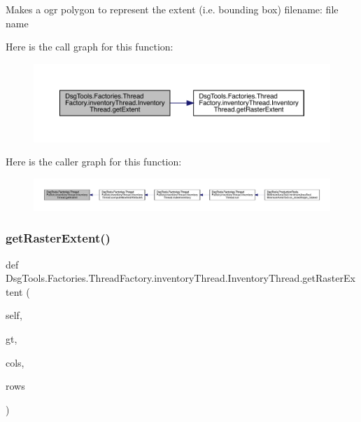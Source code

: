 \begin{DoxyVerb}Makes a ogr polygon to represent the extent (i.e. bounding box)
filename: file name
\end{DoxyVerb}
 Here is the call graph for this function\+:
\nopagebreak
\begin{figure}[H]
\begin{center}
\leavevmode
\includegraphics[width=350pt]{class_dsg_tools_1_1_factories_1_1_thread_factory_1_1inventory_thread_1_1_inventory_thread_a9b4252c1a4521ad460bd13842fe02483_cgraph}
\end{center}
\end{figure}
Here is the caller graph for this function\+:
\nopagebreak
\begin{figure}[H]
\begin{center}
\leavevmode
\includegraphics[width=350pt]{class_dsg_tools_1_1_factories_1_1_thread_factory_1_1inventory_thread_1_1_inventory_thread_a9b4252c1a4521ad460bd13842fe02483_icgraph}
\end{center}
\end{figure}
\mbox{\label{class_dsg_tools_1_1_factories_1_1_thread_factory_1_1inventory_thread_1_1_inventory_thread_a6fa65de4be1523486c67c51a95b0bd8c}} 
\subsubsection{\texorpdfstring{get\+Raster\+Extent()}{getRasterExtent()}}
{\footnotesize\ttfamily def Dsg\+Tools.\+Factories.\+Thread\+Factory.\+inventory\+Thread.\+Inventory\+Thread.\+get\+Raster\+Extent (\begin{DoxyParamCaption}\item[{}]{self,  }\item[{}]{gt,  }\item[{}]{cols,  }\item[{}]{rows }\end{DoxyParamCaption})}

